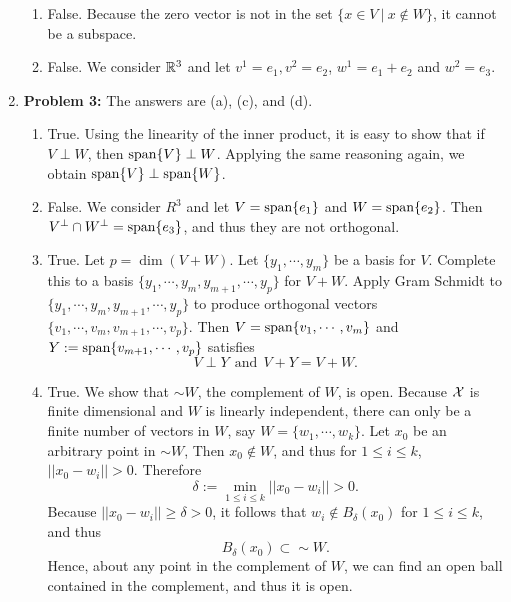 \documentclass[letterpaper]{article}
\begin{document}
\begin{enumerate}
\begin{enumerate}
    \item False. Because the zero vector is not in the set $\{ x \in V~|~ x \not \in W\}$, it cannot be a subspace.

        \item False. We consider $\mathbb R^3$ and let $v^1 = e_1, v^2=e_2$, $w^1 = e_1+e_2$ and $w^2 = e_3$.
\end{enumerate}

\item \noindent \textbf{Problem 3:}
The answers are (a), (c), and (d).
\begin{enumerate}
\setlength{\itemsep}{.1in}
\renewcommand{\labelenumi}{(\alph{enumi})}

\item True. Using the linearity of the inner product, it is easy to show that if $V \perp W$, then $\textrm{span} \{ V \} \perp W$. Applying the same reasoning again, we obtain $\textrm{span} \{ V \} \perp \textrm{span} \{ W \}$.

\item False. We consider $R^3$ and let $V=\textrm{span} \{ e_1 \}$ and $W=\textrm{span} \{ e_2 \}$. Then $V^\perp \cap W^\perp = \textrm{span} \{ e_3 \}$, and thus they are not orthogonal.

\item True. Let $p = \dim (V+W)$. Let $\{y_1, \cdots, y_m\}$ be a basis for $V$. Complete this to a basis $\{y_1, \cdots, y_m, y_{m+1}, \cdots, y_p\}$ for $V+W$. Apply Gram Schmidt to $\{y_1, \cdots, y_m, y_{m+1}, \cdots, y_p\}$ to produce orthogonal vectors $\{v_1, \cdots, v_m, v_{m+1}, \cdots,v_p\}$. Then $V=\textrm{span} \{ v_1, \cdots, v_m \}$ and  $Y:=\textrm{span} \{ v_{m+1}, \cdots,v_p \}$ satisfies
    $$ V \perp Y~~\text{and}~~ V+Y = V + W.$$


\item True. We show that $\sim W$, the complement of $W$, is open. Because ${\cal X}$ is finite dimensional and $W$ is linearly independent, there can only be a finite number of vectors in $W$,  say $W=\{ w_1, \cdots, w_k\}$. Let $x_0$ be an arbitrary point in $\sim W$, Then $x_0 \not \in W$, and thus for $1 \le i \le k$,  $||x_0-w_i|| >0$. Therefore
    $$ \delta := \min_{1 \le i \le k} ||x_0-w_i|| >0.$$
Because $|| x_0 -w_i||\ge \delta >0$, it follows that $w_i \not \in B_{\delta}(x_0)$ for $1 \le i \le k$, and thus
$$ B_{\delta}(x_0) \subset \sim W.$$
Hence, about any point in the complement of $W$, we can find an open ball contained in the complement, and thus it is open.

\end{enumerate}



\end{enumerate}
\end{document}
